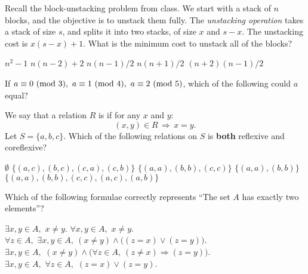 \begin{questions}

\vspace{1.8in}

\question Recall the block-unstacking problem from class. 
We start with a stack of $n$ blocks, and the objective is to unstack them fully. 
The \emph{unstacking operation} takes a stack of size $s$, and splits it into two stacks, of size $x$ and $s-x$. 
The unstacking cost is $x(s-x) + 1$.  What is the minimum cost to unstack all of the blocks? 
\begin{choices}
\choice $n^2-1$
\choice $n(n-2) + 2$
\choice $n(n-1)/2$ 
\choice $n(n+1)/2$
\choice $(n+2)(n-1)/2$
\end{choices}

\newpage

\question If $a \equiv 0 \Mod 3,\ a \equiv 1 \Mod 4,\ a \equiv 2 \Mod 5$, which of the following could $a$ equal?
\begin{choices}
\end{choices}


\vspace{1.8in}

\question We say that a relation $R$ is  if for any $x$ and $y$: 
$$ %
(x,y)\in R \, \Rightarrow\,  x=y.$$  
Let $S = \{a, b, c\}$.  Which of the following relations on $S$ is
{\bf both} reflexive and coreflexive?
\begin{choices}
\choice $\emptyset$
\choice $\{(a,c),(b,c),(c,a),(c,b)\}$
\choice $\{(a,a),(b,b),(c,c)\}$
\choice $\{(a,a),(b,b)\}$
\choice $\{(a,a),(b,b),(c,c),(a,c),(a,b)\}$
\end{choices}

\newpage

\question Which of the following formulae correctly represents ``The set $A$ has exactly two elements''?
\begin{choices}
\choice $\exists x,y\in A,\,\, x\neq y$.
\choice $\forall x,y\in A,\,\, x\neq y$.
\choice $\forall z\in A,\,\, \exists x,y\in A,\ (x\neq y)\land \big( (z=x) \lor (z=y) \big)$.
\choice $\exists x,y\in A,\,\, (x\neq y)\land \big(\forall z\in A,\ (z\neq x) \Rightarrow (z=y)\big)$.
\choice $\exists x,y\in A,\,\, \forall z\in A,\,\, (z=x) \lor (z=y)$.
\end{choices}


\vspace{1.8in}



\end{questions}
